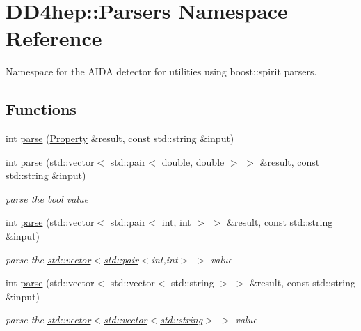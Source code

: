\hypertarget{namespace_d_d4hep_1_1_parsers}{
\section{DD4hep::Parsers Namespace Reference}
\label{namespace_d_d4hep_1_1_parsers}
}


Namespace for the AIDA detector for utilities using boost::spirit parsers.  
\subsection*{Functions}
\begin{DoxyCompactItemize}
\item 
int \hyperlink{namespace_d_d4hep_1_1_parsers_a49cf20eb52b8e48550d6e3f74b94069e}{parse} (\hyperlink{class_d_d4hep_1_1_property}{Property} \&result, const std::string \&input)
\item 
int \hyperlink{namespace_d_d4hep_1_1_parsers_ad0d0bfb1ee52c6c6fe6000325562b1fa}{parse} (std::vector$<$ std::pair$<$ double, double $>$ $>$ \&result, const std::string \&input)
\begin{DoxyCompactList}\small\item\em parse the {\ttfamily bool} value \item\end{DoxyCompactList}\item 
int \hyperlink{namespace_d_d4hep_1_1_parsers_a300ef2062786116541bef473b809ee22}{parse} (std::vector$<$ std::pair$<$ int, int $>$ $>$ \&result, const std::string \&input)
\begin{DoxyCompactList}\small\item\em parse the {\ttfamily \hyperlink{classstd_1_1vector}{std::vector}$<$\hyperlink{classstd_1_1pair}{std::pair}$<$int,int$>$ $>$} value \item\end{DoxyCompactList}\item 
int \hyperlink{namespace_d_d4hep_1_1_parsers_afd6bbff0d1fc52ec885e45126f670506}{parse} (std::vector$<$ std::vector$<$ std::string $>$ $>$ \&result, const std::string \&input)
\begin{DoxyCompactList}\small\item\em parse the {\ttfamily \hyperlink{classstd_1_1vector}{std::vector}$<$\hyperlink{classstd_1_1vector}{std::vector}$<$\hyperlink{classstd_1_1string}{std::string}$>$ $>$} value \item\end{DoxyCompactList}\item 

\end{DoxyCompactItemize}
